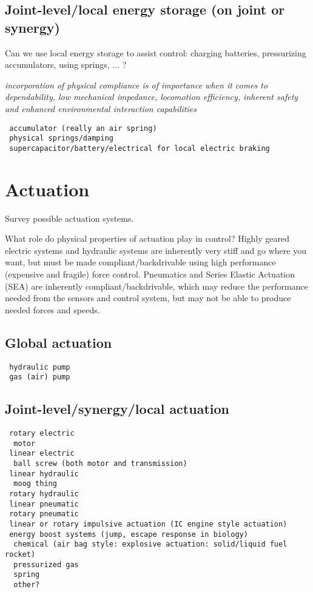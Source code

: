 \documentclass[letterpaper,12pt,fullpage]{article}
\begin{document}
\subsection{Joint-level/local energy storage (on joint or synergy)}

Can we use local energy storage to assist control: charging batteries,
pressurizing accumulators, using springs, ... ?

{\it incorporation of physical
compliance is of importance when it comes to dependability,
low mechanical impedance, locomotion efficiency, inherent
safety and enhanced environmental interaction capabilities}~\cite{IEEE07139975}

\begin{verbatim}
 accumulator (really an air spring)
 physical springs/damping
 supercapacitor/battery/electrical for local electric braking
\end{verbatim}

\section{Actuation}

Survey possible actuation systems.

What role do physical properties of actuation play in control? Highly
geared electric systems and hydraulic systems are inherently very
stiff and go where you want, but must be made compliant/backdrivable
using high performance (expensive and fragile) force control.
Pneumatics and Series Elastic Actuation (SEA) are inherently
compliant/backdrivable, which may reduce the performance
needed from the sensors and control system, but may not be able to
produce needed forces and speeds.

\subsection{Global actuation}

\begin{verbatim}
 hydraulic pump 
 gas (air) pump
\end{verbatim}

\subsection{Joint-level/synergy/local actuation}

\begin{verbatim}
 rotary electric
  motor
 linear electric
  ball screw (both motor and transmission)
 linear hydraulic
  moog thing
 rotary hydraulic
 linear pneumatic
 rotary pneumatic
 linear or rotary impulsive actuation (IC engine style actuation)
 energy boost systems (jump, escape response in biology)
  chemical (air bag style: explosive actuation: solid/liquid fuel rocket)
  pressurized gas
  spring
  other?
\end{verbatim}
\end{document}
